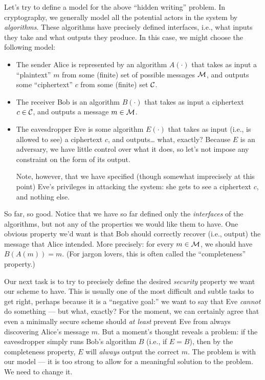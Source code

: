 \documentclass[11pt]{article}
\begin{document}
Let's try to define a model for the above ``hidden writing'' problem.
In cryptography, we generally model all the potential actors in the
system by \emph{algorithms}.  These algorithms have precisely defined
interfaces, i.e., what inputs they take and what outputs they produce.
In this case, we might choose the following model:
\begin{itemize}
\item The sender Alice is represented by an algorithm $A(\cdot)$ that
  takes as input a ``plaintext'' $m$ from some (finite) set of
  possible messages $\mathcal{M}$, and outputs some ``ciphertext'' $c$
  from some (finite) set $\mathcal{C}$.
\item The receiver Bob is an algorithm $B(\cdot)$ that takes as input
  a ciphertext $c \in \mathcal{C}$, and outputs a message $m \in
  \mathcal{M}$.
\item The eavesdropper Eve is some algorithm $E(\cdot)$ that takes as
  input (i.e., is allowed to see) a ciphertext $c$, and outputs\ldots
  what, exactly?  Because $E$ is an adversary, we have little control
  over what it does, so let's not impose any constraint on the form of
  its output.  

  Note, however, that we have specified (though somewhat imprecisely
  at this point) Eve's privileges in attacking the system: she gets to
  see a ciphertext $c$, and nothing else.
\end{itemize}
So far, so good.  Notice that we have so far defined only the
\emph{interfaces} of the algorithms, but not any of the properties we
would like them to have.  One obvious property we'd want is that Bob
should correctly recover (i.e., output) the message that Alice
intended.  More precisely: for every $m \in \mathcal{M}$, we should have
$B(A(m)) = m$.  (For jargon lovers, this is often called the
``completeness'' property.)

Our next task is to try to precisely define the desired
\emph{security} property we want our scheme to have.  This is usually
one of the most difficult and subtle tasks to get right, perhaps
because it is a ``negative goal:'' we want to say that Eve
\emph{cannot} do something --- but what, exactly?  For the moment, we
can certainly agree that even a minimally secure scheme should
\emph{at least} prevent Eve from always discovering Alice's message
$m$.  But a moment's thought reveals a problem: if the eavesdropper
simply runs Bob's algorithm $B$ (i.e., if $E = B$), then by the
completeness property, $E$ will \emph{always} output the correct $m$.
The problem is with our model --- it is too strong to allow for a
meaningful solution to the problem.  We need to change it.
\end{document}
